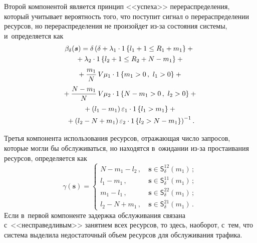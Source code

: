 \begin{multicols}{2}
  \vspace*{-4pt}
  
  Второй компонентой является принцип <<успеха>> перераспределения, 
который учитывает вероятность того, что поступит сигнал о перераспределении 
ресурсов, но перераспределения не произойдет из-за состояния системы, 
и~определяется как
  \begin{multline*}
  \beta_\delta(\bm{s})= \delta\left( \delta+\lambda_1\cdot 1\left\{ l_1+1\leq 
R_1+m_1\right\} +{}\right.\\
  {}+ \lambda_2\cdot 1\left\{ l_2+1\leq R_2+N-m_1\right\}+{}\\
  {}+
  \displaystyle\frac{\displaystyle m_1\mathstrut}{\displaystyle N\mathstrut}\,V\mu_1\cdot 1\left\{ m_1>0\,,\ l_1>0\right\} +{}\\
  {}+\displaystyle\frac{\displaystyle N-
m_1\mathstrut}{\displaystyle N\mathstrut}\,V\mu_2\cdot 1\left\{ N-m_1>0\,,\ l_2>0\right\}+{}\\
  {}+
\left(l_1-m_1\right)\varepsilon_1\cdot 1\left\{ l_1>m_1\right\} +{}\\
    \left.{}+\left( l_2-
N+m_1\right)\varepsilon_2 \cdot 1\left\{l_2>N-m_1\right\}\right)^{-1}.
  \end{multline*}
  
  Третья компонента использования ресурсов, отражающая число 
запросов, которые могли бы обслуживаться, но находятся в~ожидании из-за 
простаивания ресурсов, определяется как 
  \begin{equation*}
  \gamma(\bm{s})= \begin{cases}
  N-m_1-l_2\,, & \ \bm{s}\in \mathsf{S}_\delta^{12}(m_1)\,;\\
  l_1-m_1\,, &\ \bm{s}\in \mathsf{S}_\delta^{11}(m_1)\,;\\
  m_1-l_1\,, &\ \bm{s}\in \mathsf{S}_\delta^{22}(m_1)\,;\\
  l_2-N+m_1\,, &\ \bm{s}\in \mathsf{S}_\delta^{21}(m_1)\,.
  \end{cases}
  \end{equation*}
    Если в~первой компоненте задержка обслуживания связана 
    с~<<несправедливым>> занятием всех ресурсов, то здесь, наоборот, с~тем, что 
система выделила недостаточный объем ресурсов для обслуживания трафика. 
  

\end{multicols}
